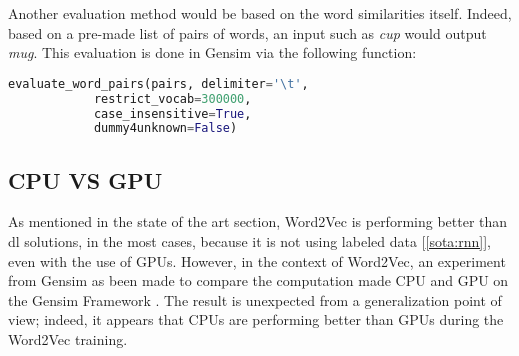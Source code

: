 Another evaluation method would be based on the word similarities itself. Indeed, based on a pre-made list of pairs of words, an input such as \textit{cup} would output \textit{mug}. This evaluation is done in Gensim via the following function:

\begin{lstlisting}[language=Python]
evaluate_word_pairs(pairs, delimiter='\t',
            restrict_vocab=300000,
            case_insensitive=True,
            dummy4unknown=False)
\end{lstlisting}


\subsection{CPU VS GPU}
As mentioned in the state of the art section, Word2Vec is performing better than \gls{dl} solutions, in the most cases, because it is not using labeled data [\ref{sota:rnn}], even with the use of GPUs. However, in the context of Word2Vec, an experiment from Gensim as been made to compare the computation made CPU and GPU on the Gensim Framework \cite{article:word2vec-cpu-gpu}. The result is unexpected from a generalization point of view; indeed, it appears that CPUs are performing better than GPUs during the Word2Vec training.

